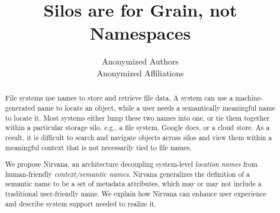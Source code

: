 \documentclass[letterpaper,twocolumn,10pt]{article}
\title{\Large \bf Silos are for Grain, not Namespaces}
\author{
{\rm Anonymized Authors}\\
Anonymized Affiliations
}
\date{}
\begin{document}
\maketitle

\begin{abstract}

File systems use names to store and retrieve file data. A system can use a machine-generated name to locate an object, while a user needs a semantically meaningful name to locate it. Most systems either lump these two names into one, or tie them together within a particular storage silo, e.g., a file system, Google docs, or a cloud store. As a result, it is difficult to search and navigate objects across silos and view them within a meaningful context that is not necessarily tied to file names. 

We propose Nirvana, an architecture decoupling system-level \textit{location names} from human-friendly \textit{context/semantic names}. Nirvana generalizes the definition of a semantic name to be a set of metadata attributes, which may or may not include a traditional user-friendly name. We explain how Nirvana can enhance user experience and describe system support needed to realize it.

\end{abstract}


 
 
% 
 
 
 


\clearpage
\pagebreak


\end{document}
